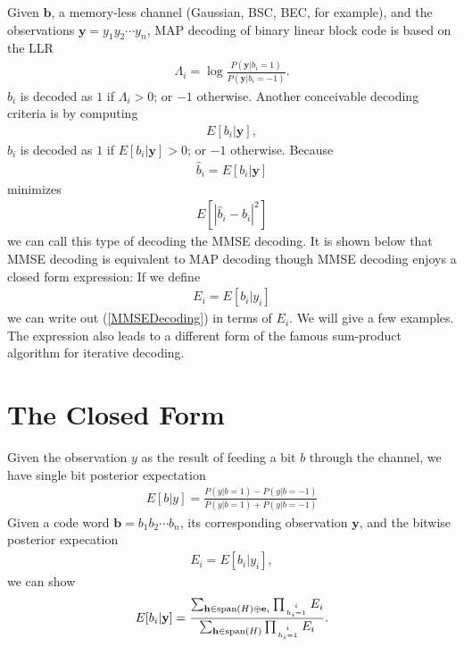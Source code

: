 \documentclass[12pt]{article}
\newcommand{\vect}[1]{\mathbf{#1}}
\begin{document}
Given $\vect{b}$, a memory-less channel (Gaussian, BSC, BEC, for example), and the observations $\vect{y}=y_1y_2\cdots y_n$, MAP decoding of binary linear block code is based on the LLR
\begin{align}
\Lambda_i = \log \frac{P(\vect{y}|b_i=1)}{P(\vect{y}|b_i=-1)}.
\end{align}
$b_i$ is decoded as $1$ if $\Lambda_i>0$; or $-1$ otherwise. Another conceivable decoding criteria is by computing
\begin{align}
E[b_i|\vect{y}],  \label{MMSEDecoding}
\end{align}
$b_i$ is decoded as $1$ if $E[b_i|\vect{y}]>0$; or $-1$ otherwise. Because
\begin{align}
\hat{b}_i = E[b_i|\vect{y}]
\end{align}
minimizes
\begin{align*}
E[|\hat{b}_i-b_i|^2]
\end{align*}
we can call this type of decoding the MMSE decoding. It is shown below that MMSE decoding is equivalent to MAP decoding though MMSE decoding enjoys a closed form expression: If we define
\begin{align}
E_i = E[b_i|y_i]
\end{align}
we can write out (\ref{MMSEDecoding}) in terms of $E_i$. We will give a few examples. The expression also leads to a different form of the famous sum-product algorithm for iterative decoding.

\section{The Closed Form}
Given the observation $y$ as the result of feeding a bit $b$ through the channel, we have single bit posterior expectation
\begin{align}
E[b|y] = \frac{P(y|b=1)-P(y|b=-1)}{P(y|b=1)+P(y|b=-1)} \label{e:single_observation_mmse}
\end{align}
Given a code word $\vect{b} = b_1b_2\cdots b_n$, its corresponding observation $\vect{y}$, and the bitwise posterior expecation
\begin{align}
E_i = E[b_i|y_i],
\end{align}
we can show
\begin{align}
E[b_i|\vect{y}] = \frac{\sum_{\vect{h}\in \mathrm{span} (H)\oplus \vect{e}_i}\prod_{i\atop h_i=1}E_i}{\sum_{\vect{h}\in \mathrm{span} (H)}\prod_{i\atop h_i=1}E_i}. \label{e:closedform}
\end{align}
\end{document}
